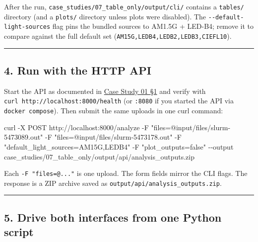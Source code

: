 \documentclass[
  11pt,
]{article}
\newenvironment{Shaded}{}{}
\newcommand{\AttributeTok}[1]{\textcolor[rgb]{0.49,0.56,0.16}{#1}}
\newcommand{\ExtensionTok}[1]{#1}
\newcommand{\NormalTok}[1]{#1}
\newcommand{\StringTok}[1]{\textcolor[rgb]{0.25,0.44,0.63}{#1}}
\begin{document}
After the run, \texttt{case\_studies/07\_table\_only/output/cli/}
contains a \texttt{tables/} directory (and a \texttt{plots/} directory
unless plots were disabled). The \texttt{-\/-default-light-sources} flag
pins the bundled sources to AM1.5G + LED-B4; remove it to compare
against the full default set (\texttt{AM15G,LEDB4,LEDB2,LEDB3,CIEFL10}).

\begin{center}\rule{0.5\linewidth}{0.5pt}\end{center}

\hypertarget{4-run-with-the-http-api}{
\subsection{4. Run with the HTTP API}\label{4-run-with-the-http-api}}

Start the API as documented in
\href{https://github.com/pinarsyt/overlap-calculator/blob/main/case_studies/01_theoretical_only/README.md\#1-prerequisites}{Case
Study 01 §1} and verify with
\texttt{curl\ http://localhost:8000/health} (or \texttt{:8080} if you
started the API via \texttt{docker\ compose}). Then submit the same
uploads in one curl command:

\begin{Shaded}
\begin{Highlighting}[]
\ExtensionTok{curl} \AttributeTok{{-}X}\NormalTok{ POST http://localhost:8000/analyze }\AttributeTok{{-}F} \StringTok{"files=@input/files/slurm{-}5473089.out"} \AttributeTok{{-}F} \StringTok{"files=@input/files/slurm{-}5473178.out"} \AttributeTok{{-}F} \StringTok{"default\_light\_sources=AM15G,LEDB4"} \AttributeTok{{-}F} \StringTok{"plot\_outputs=false"} \AttributeTok{{-}{-}output}\NormalTok{ case\_studies/07\_table\_only/output/api/analysis\_outputs.zip}
\end{Highlighting}
\end{Shaded}

Each \texttt{-F\ "files=@..."} is one upload. The form fields mirror the
CLI flags. The response is a ZIP archive saved as
\texttt{output/api/analysis\_outputs.zip}.

\begin{center}\rule{0.5\linewidth}{0.5pt}\end{center}

\hypertarget{5-drive-both-interfaces-from-one-python-script}{
\subsection{5. Drive both interfaces from one Python
script}\label{5-drive-both-interfaces-from-one-python-script}}
\end{document}
